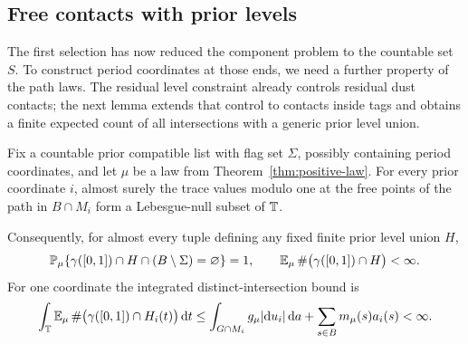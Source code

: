 \subsection{Free contacts with prior levels}

The first selection has now reduced the component problem to the
countable set $S$.  To construct period coordinates at those ends, we
need a further property of the path laws.  The residual level constraint
already controls residual dust contacts; the next lemma extends that
control to contacts inside tags and obtains a finite expected count of
all intersections with a generic prior level union.

\begin{lemma}
\label{lem:law-levels}
Fix a countable prior compatible list with flag set $\Sigma$, possibly
containing period coordinates, and let $\mu$ be a law from
Theorem~\ref{thm:positive-law}.  For every prior coordinate $i$, almost
surely the trace values modulo one at the free points of the path in
$B\cap M_i$ form a Lebesgue-null subset of $\mathbb T$.

Consequently, for almost every tuple defining any fixed finite prior
level union $H$,
\[
 \operatorname{\mathbb P}_\mu\{\gamma([0,1])\cap H\cap(B\setminus\Sigma)
                         =\varnothing\}=1,
 \qquad
 \operatorname{\mathbb E}_\mu\#\bigl(\gamma([0,1])\cap H\bigr)<\infty.
\]
For one coordinate the integrated distinct-intersection bound is
\begin{equation}
 \label{eq:law-level-count}
 \int_\mathbb T\operatorname{\mathbb E}_\mu\#\bigl(\gamma([0,1])\cap H_i(t)\bigr)\,\mathrm d t
 \le \int_{G\cap M_i}g_\mu|\mathrm d u_i|\,\mathrm d a
       +\sum_{s\in B}m_\mu(s)a_i(s)<\infty.
\end{equation}
\end{lemma}

